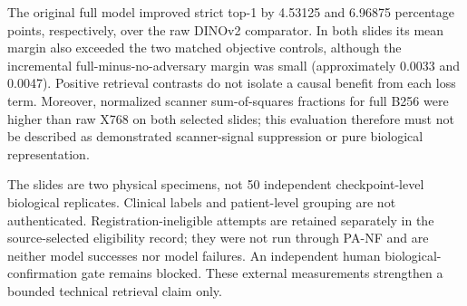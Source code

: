 The original full model improved strict top-1 by 4.53125 and 6.96875 percentage points, respectively, over the raw DINOv2 comparator. In both slides its mean margin also exceeded the two matched objective controls, although the incremental full-minus-no-adversary margin was small (approximately 0.0033 and 0.0047). Positive retrieval contrasts do not isolate a causal benefit from each loss term. Moreover, normalized scanner sum-of-squares fractions for full B256 were higher than raw X768 on both selected slides; this evaluation therefore must not be described as demonstrated scanner-signal suppression or pure biological representation.

The slides are two physical specimens, not 50 independent checkpoint-level biological replicates. Clinical labels and patient-level grouping are not authenticated. Registration-ineligible attempts are retained separately in the source-selected eligibility record; they were not run through PA-NF and are neither model successes nor model failures. An independent human biological-confirmation gate remains blocked. These external measurements strengthen a bounded technical retrieval claim only.
